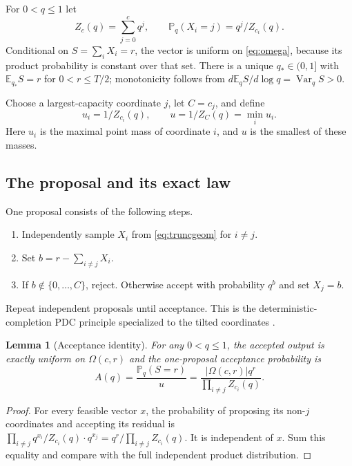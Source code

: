 \documentclass[11pt,a4paper]{article}
\newtheorem{lemma}[theorem]{Lemma}
\theoremstyle{definition}
\newcommand{\E}{\mathbb E}
\newcommand{\Prob}{\mathbb P}
\newcommand{\Var}{\operatorname{Var}}
\newcommand{\abs}[1]{\left|#1\right|}
\begin{document}
For $0<q\le1$ let
\begin{equation}\label{eq:truncgeom}
 Z_c(q)=\sum_{j=0}^c q^j,\qquad
 \Prob_q(X_i=j)=q^j/Z_{c_i}(q).
\end{equation}
Conditional on $S=\sum_iX_i=r$, the vector is uniform on \eqref{eq:omega}, because its product probability is constant over that set. There is a unique $q_*\in(0,1]$ with $\E_{q_*}S=r$ for $0<r\le T/2$; monotonicity follows from
$d\E_qS/d\log q=\Var_qS>0$.

Choose a largest-capacity coordinate $j$, let $C=c_j$, and define
\[
 u_i=1/Z_{c_i}(q),\qquad u=1/Z_C(q)=\min_i u_i.
\]
Here $u_i$ is the maximal point mass of coordinate $i$, and $u$ is the smallest of these masses.

\subsection{The proposal and its exact law}

One proposal consists of the following steps.
\begin{enumerate}
\item Independently sample $X_i$ from \eqref{eq:truncgeom} for $i\ne j$.
\item Set $b=r-\sum_{i\ne j}X_i$.
\item If $b\notin\{0,\ldots,C\}$, reject. Otherwise accept with probability $q^b$ and set $X_j=b$.
\end{enumerate}
Repeat independent proposals until acceptance. This is the deterministic-completion PDC principle specialized to the tilted coordinates \cite{dz}.

\begin{lemma}[Acceptance identity]\label{lem:acceptance}
For any $0<q\le1$, the accepted output is exactly uniform on $\Omega(c,r)$ and the one-proposal acceptance probability is
\begin{equation}\label{eq:acceptance}
 A(q)=\frac{\Prob_q(S=r)}{u}
 =\frac{\abs{\Omega(c,r)}q^r}{\prod_{i\ne j}Z_{c_i}(q)}.
\end{equation}
\end{lemma}
\begin{proof}
For every feasible vector $x$, the probability of proposing its non-$j$ coordinates and accepting its residual is
$\prod_{i\ne j}q^{x_i}/Z_{c_i}(q)\cdot q^{x_j}
=q^r/\prod_{i\ne j}Z_{c_i}(q)$.
It is independent of $x$. Sum this equality and compare with the full independent product distribution.
\end{proof}
\end{document}
